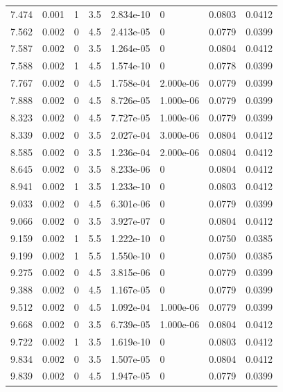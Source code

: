 \documentclass[preview]{standalone}
\begin{document}
{{{\begin{tabular}{L{1.2cm}C{1.2cm} C{0.3cm}C{0.5cm} C{1.4cm}C{1.4cm} C{1.4cm}C{1.4cm}}
  7.474  &  0.001  & 1     & 3.5 &  2.834e-10  & 0  & 0.0803 &  0.0412   \\ 
  7.562  &  0.002  & 0     & 4.5 &  2.413e-05  & 0  & 0.0779 &  0.0399   \\ 
  7.587  &  0.002  & 0     & 3.5 &  1.264e-05  & 0  & 0.0804 &  0.0412   \\ 
  7.588  &  0.002  & 1     & 4.5 &  1.574e-10  & 0  & 0.0778 &  0.0399   \\ 
  7.767  &  0.002  & 0     & 4.5 &  1.758e-04  & 2.000e-06  & 0.0779 &  0.0399   \\ 
  7.888  &  0.002  & 0     & 4.5 &  8.726e-05  & 1.000e-06  & 0.0779 &  0.0399   \\ 
  8.323  &  0.002  & 0     & 4.5 &  7.727e-05  & 1.000e-06  & 0.0779 &  0.0399   \\ 
  8.339  &  0.002  & 0     & 3.5 &  2.027e-04  & 3.000e-06  & 0.0804 &  0.0412   \\ 
  8.585  &  0.002  & 0     & 3.5 &  1.236e-04  & 2.000e-06  & 0.0804 &  0.0412   \\ 
  8.645  &  0.002  & 0     & 3.5 &  8.233e-06  & 0  & 0.0804 &  0.0412   \\ 
  8.941  &  0.002  & 1     & 3.5 &  1.233e-10  & 0  & 0.0803 &  0.0412   \\ 
  9.033  &  0.002  & 0     & 4.5 &  6.301e-06  & 0  & 0.0779 &  0.0399   \\ 
  9.066  &  0.002  & 0     & 3.5 &  3.927e-07  & 0  & 0.0804 &  0.0412   \\ 
  9.159  &  0.002  & 1     & 5.5 &  1.222e-10  & 0  & 0.0750 &  0.0385   \\ 
  9.199  &  0.002  & 1     & 5.5 &  1.550e-10  & 0  & 0.0750 &  0.0385   \\ 
  9.275  &  0.002  & 0     & 4.5 &  3.815e-06  & 0  & 0.0779 &  0.0399   \\ 
  9.388  &  0.002  & 0     & 4.5 &  1.167e-05  & 0  & 0.0779 &  0.0399   \\ 
  9.512  &  0.002  & 0     & 4.5 &  1.092e-04  & 1.000e-06  & 0.0779 &  0.0399   \\ 
  9.668  &  0.002  & 0     & 3.5 &  6.739e-05  & 1.000e-06  & 0.0804 &  0.0412   \\ 
  9.722  &  0.002  & 1     & 3.5 &  1.619e-10  & 0  & 0.0803 &  0.0412   \\ 
  9.834  &  0.002  & 0     & 3.5 &  1.507e-05  & 0  & 0.0804 &  0.0412   \\ 
  9.839  &  0.002  & 0     & 4.5 &  1.947e-05  & 0  & 0.0779 &  0.0399   \\ 

\end{tabular}}}}
\end{document}

